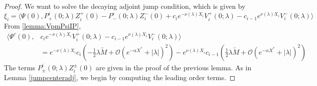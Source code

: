 \documentclass[thesis.tex]{subfiles}
\begin{document}
\begin{lemma}
\begin{proof}
We want to solve the decaying adjoint jump condition, which is given by
\[
\xi_i = 
\langle \Psi(0), P^i_+(0; \lambda) Z_i^+(0) - P^i_-(0; \lambda) Z_i^-(0) + c_i e^{-\nu(\lambda)X_i}V_i^+(0; \lambda) - c_{i-1} e^{\nu(\lambda)X_i} V_i^-(0; \lambda) \rangle 
\]
From \cref{lemma:VpmPsiIP},
\begin{align}\label{PsiVpmjump}
\langle \Psi^c(0), &c_i e^{-\nu(\lambda)X_i}V_i^+(0; \lambda) - c_{i-1} e^{\nu(\lambda)X_i} V_i^-(0; \lambda)  \rangle \\
&= e^{-\nu(\lambda)X_i}c_i\left(-\frac{1}{2}\lambda \tilde{M} + \mathcal{O}(e^{-\alpha X^*} +|\lambda|)^2 \right) 
- e^{\nu(\lambda)X_i}c_{i-1}\left(\frac{1}{2}\lambda \tilde{M} + \mathcal{O}(e^{-\alpha X^*} +|\lambda|)^2 \right)
\end{align}
The terms $P^i_\pm(0; \lambda) Z_i^\pm(0)$ are given in the proof of the previous lemma. As in Lemma \ref{jumpcenteradj}, we begin by computing the leading order terms.


\end{proof}
\end{lemma}
\end{document}
